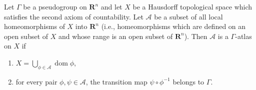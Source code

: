 Let $\Gamma$ be a pseudogroup on $\mathbf{R}^n$ and let $X$ be a Hausdorff topological space which satisfies the second axiom of countability. Let $\mathcal{A}$ be a subset of all local homeomorphisms of $X$ into $\mathbf{R}^n$ (i.e., homeomorphisms which are defined on an open subset of $X$ and whose range is an open subset of $\mathbf{R}^n$). Then $\mathcal{A}$ is a $\Gamma$-atlas on $X$ if

\begin{enumerate}
\item[(a)] $\displaystyle X = \bigcup_{\phi \in \mathcal{A}} \operatorname{dom} \phi$,
\item[(b)] for every pair $\phi, \psi \in \mathcal{A}$, the transition map $\psi \circ \phi^{-1}$ belongs to $\Gamma$.
\end{enumerate}
